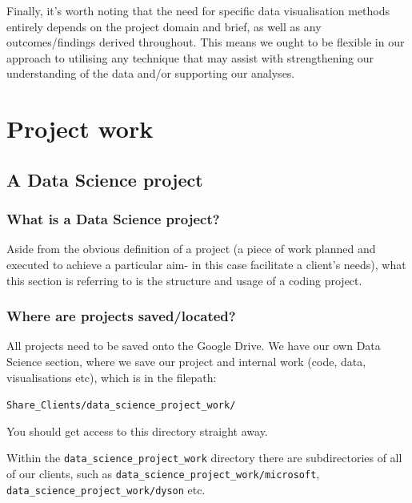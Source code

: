 \documentclass[
  letterpaper,
  DIV=11,
  numbers=noendperiod]{scrreprt}
\begin{document}
Finally, it's worth noting that the need for specific data visualisation
methods entirely depends on the project domain and brief, as well as any
outcomes/findings derived throughout. This means we ought to be flexible
in our approach to utilising any technique that may assist with
strengthening our understanding of the data and/or supporting our
analyses.

\part{Project work}

\chapter{A Data Science project}\label{a-data-science-project}

\section{What is a Data Science
project?}\label{what-is-a-data-science-project}

Aside from the obvious definition of a project (a piece of work planned
and executed to achieve a particular aim- in this case facilitate a
client's needs), what this section is referring to is the structure and
usage of a coding project.

\section{Where are projects
saved/located?}\label{where-are-projects-savedlocated}

All projects need to be saved onto the Google Drive. We have our own
Data Science section, where we save our project and internal work (code,
data, visualisations etc), which is in the filepath:

\texttt{Share\_Clients/data\_science\_project\_work/}

You should get access to this directory straight away.

Within the \texttt{data\_science\_project\_work} directory there are
subdirectories of all of our clients, such as
\texttt{data\_science\_project\_work/microsoft},
\texttt{data\_science\_project\_work/dyson} etc.
\end{document}
